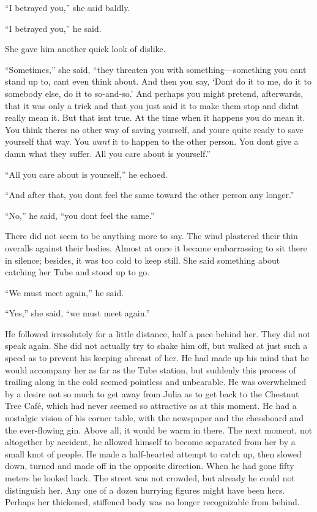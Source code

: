 ``I betrayed you,'' she said baldly.

``I betrayed you,'' he said.

She gave him another quick look of dislike.

``Sometimes,'' she said, ``they threaten you with something---something you
can\textquotesingle t stand up to, can\textquotesingle t even think
about. And then you say, `Don\textquotesingle t do it to
me, do it to somebody else, do it to so-and-so.' And
perhaps you might pretend, afterwards, that it was only a trick and that
you just said it to make them stop and didn\textquotesingle t really
mean it. But that isn\textquotesingle t true. At the time when it
happens you do mean it. You think there\textquotesingle s no other way
of saving yourself, and you\textquotesingle re quite ready to save
yourself that way. You \emph{want} it to happen to the other person. You
don\textquotesingle t give a damn what they suffer. All you care about
is yourself.''

``All you care about is yourself,'' he echoed.

``And after that, you don\textquotesingle t feel the same toward the
other person any longer.''

``No,'' he said, ``you don\textquotesingle t feel the same.''

There did not seem to be anything more to say. The wind plastered their
thin overalls against their bodies. Almost at once it became
embarrassing to sit there in silence; besides, it was too cold to keep
still. She said something about catching her Tube and stood up to go.

``We must meet again,'' he said.

``Yes,'' she said, ``we must meet again.''

He followed irresolutely for a little distance, half a pace behind her.
They did not speak again. She did not actually try to shake him off, but
walked at just such a speed as to prevent his keeping abreast of her. He
had made up his mind that he would accompany her as far as the Tube
station, but suddenly this process of trailing along in the cold seemed
pointless and unbearable. He was overwhelmed by a desire not so much to
get away from Julia as to get back to the Chestnut Tree Café, which had
never seemed so attractive as at this moment. He had a nostalgic vision
of his corner table, with the newspaper and the chessboard and the
ever-flowing gin. Above all, it would be warm in there. The next moment,
not altogether by accident, he allowed himself to become separated from
her by a small knot of people. He made a half-hearted attempt to catch
up, then slowed down, turned and made off in the opposite direction.
When he had gone fifty meters he looked back. The street was not
crowded, but already he could not distinguish her. Any one of a dozen
hurrying figures might have been hers. Perhaps her thickened, stiffened
body was no longer recognizable from behind.

